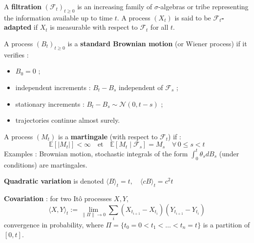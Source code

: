 \begin{f}
	
A \textbf{filtration} \((\mathcal{F}_t)_{t \geq 0}\) is an increasing family of \(\sigma\)-algebras or tribe representing the information available up to time \(t\). A process \((X_t)\) is said to be \textbf{\(\mathcal{F}_t\)-adapted} if \(X_t\) is measurable with respect to \(\mathcal{F}_t\) for all \(t\).
	
A process \((B_t)_{t \geq 0}\) is a \textbf{standard Brownian motion} (or Wiener process) if it verifies :
	\begin{itemize} 
		\item \(B_0 = 0\) ;
		\item independent increments : \(B_t - B_s\)  independent of \(\mathcal{F}_s\) ;
		\item stationary increments : \(B_t - B_s \sim \mathcal{N}(0, t - s)\) ;
		\item trajectories continue almost surely.
	\end{itemize}
	
	A process \((M_t)\) is a \textbf{martingale} (with respect to \(\mathcal{F}_t\)) if :
	\[
	\mathbb{E}[|M_t|] < \infty \quad \text{et} \quad \mathbb{E}[M_t \mid \mathcal{F}_s] = M_s \quad \forall\, 0 \leq s < t
	\]
	Examples : Brownian motion, stochastic integrals of the form \(\int_0^t \theta_s dB_s\) (under conditions) are martingales.
	\medskip
	
	\textbf{Quadratic variation} is denoted \(
	\langle B \rangle_t = t, \quad \langle cB \rangle_t = c^2 t\)
	
\textbf{Covariation} : for two Itô processes \(X, Y\),
\[
\langle X, Y \rangle_t := \lim_{\|\Pi\| \to 0} \sum_{i} (X_{t_{i+1}} - X_{t_i})(Y_{t_{i+1}} - Y_{t_i})
\]
convergence in probability, where \(\Pi = \{t_0 = 0 < t_1 < \dots < t_n = t\}\) is a partition of \([0,t]\).
\end{f}



